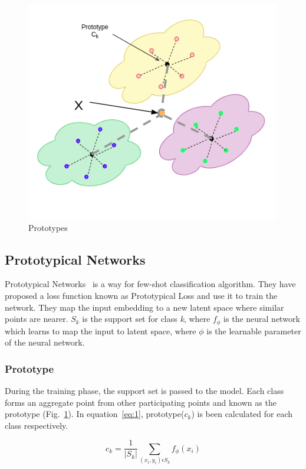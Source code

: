 \begin{figure}[t]
    \centering
    \includegraphics[scale=0.5]{figures/chapter-3/prototypes.png}
    \caption{Prototypes}
     \label{fig:unsupervised-prototypes}
\end{figure}

\subsection{Prototypical Networks}
Prototypical Networks~\cite{protonet:NIPS2017} is a way for few-shot classification algorithm. They have proposed a loss function known as Prototypical Loss and use it to train the network. They map the input embedding to a new latent space where similar points are nearer. $S_{k}$ is the support set for class \textit{k}, where $f_{\phi}$ is the neural network which learns to map the input to latent space, where $\phi$ is the learnable parameter of the neural network.

\subsubsection{Prototype}
During the training phase, the support set is passed to the model. Each class forms an aggregate point from other participating points and known as the prototype (Fig.~\ref{fig:unsupervised-prototypes}). In equation~\ref{eq:1}, prototype($c_{k}$) is been calculated for each class respectively. 

 
\begin{equation} \label{eq:1}
c_{k} = \frac{1}{|S_{k}|}  \sum_{(x_{i},y_{i}) \epsilon S_{k}}  f_{ \phi }(x_{i})
\end{equation}

